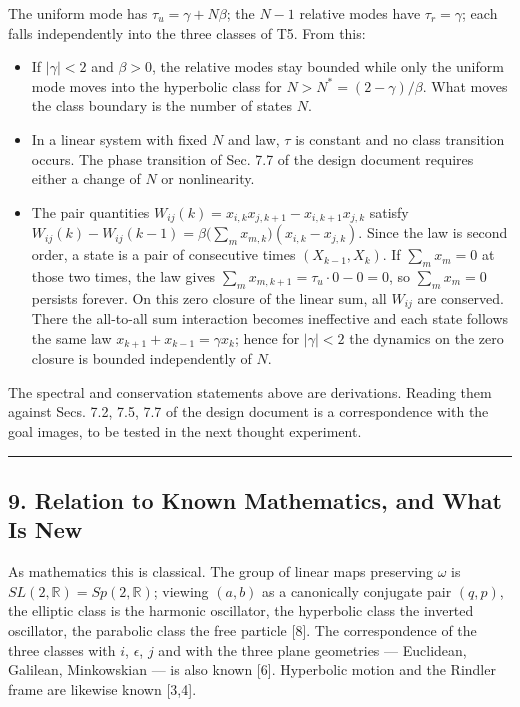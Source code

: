 \documentclass[
  a4paper,
]{article}
\providecommand{\tightlist}{%
  \setlength{\itemsep}{0pt}\setlength{\parskip}{0pt}}
\begin{document}
The uniform mode has \(\tau_u=\gamma+N\beta\); the \(N-1\) relative
modes have \(\tau_r=\gamma\); each falls independently into the three
classes of T5. From this:

\begin{itemize}
\tightlist
\item
  If \(\lvert\gamma\rvert<2\) and \(\beta>0\), the relative modes stay
  bounded while only the uniform mode moves into the hyperbolic class
  for \(N>N^{*}=(2-\gamma)/\beta\). What moves the class boundary is the
  number of states \(N\).
\item
  In a linear system with fixed \(N\) and law, \(\tau\) is constant and
  no class transition occurs. The phase transition of Sec. 7.7 of the
  design document requires either a change of \(N\) or nonlinearity.
\item
  The pair quantities \(W_{ij}(k)=x_{i,k}x_{j,k+1}-x_{i,k+1}x_{j,k}\)
  satisfy
  \(W_{ij}(k)-W_{ij}(k-1)=\beta\bigl(\sum_mx_{m,k}\bigr)(x_{i,k}-x_{j,k})\).
  Since the law is second order, a state is a pair of consecutive times
  \((X_{k-1},X_k)\). If \(\sum_mx_m=0\) at those two times, the law
  gives \(\sum_mx_{m,k+1}=\tau_u\cdot0-0=0\), so \(\sum_mx_m=0\)
  persists forever. On this zero closure of the linear sum, all
  \(W_{ij}\) are conserved. There the all-to-all sum interaction becomes
  ineffective and each state follows the same law
  \(x_{k+1}+x_{k-1}=\gamma x_k\); hence for \(\lvert\gamma\rvert<2\) the
  dynamics on the zero closure is bounded independently of \(N\).
\end{itemize}

The spectral and conservation statements above are derivations. Reading
them against Secs. 7.2, 7.5, 7.7 of the design document is a
correspondence with the goal images, to be tested in the next thought
experiment.

\begin{center}\rule{0.5\linewidth}{0.5pt}\end{center}

\subsection{9. Relation to Known Mathematics, and What Is
New}\label{relation-to-known-mathematics-and-what-is-new}

As mathematics this is classical. The group of linear maps preserving
\(\omega\) is \(SL(2,\mathbb R)=Sp(2,\mathbb R)\); viewing \((a,b)\) as
a canonically conjugate pair \((q,p)\), the elliptic class is the
harmonic oscillator, the hyperbolic class the inverted oscillator, the
parabolic class the free particle {[}8{]}. The correspondence of the
three classes with \(i\), \(\epsilon\), \(j\) and with the three plane
geometries --- Euclidean, Galilean, Minkowskian --- is also known
{[}6{]}. Hyperbolic motion and the Rindler frame are likewise known
{[}3,4{]}.
\end{document}

